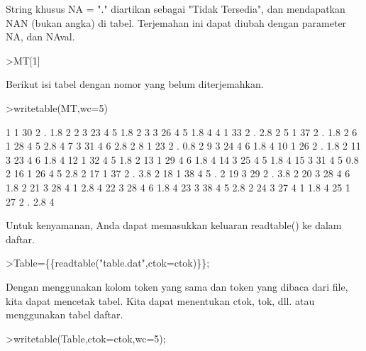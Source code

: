 \documentclass{article}
\begin{document}
\begin{eulernotebook}
\begin{eulercomment}
\begin{eulercomment}
\begin{eulercomment}
String khusus NA = "." diartikan sebagai "Tidak Tersedia", dan
mendapatkan NAN (bukan angka) di tabel. Terjemahan ini dapat diubah
dengan parameter NA, dan NAval.
\end{eulercomment}
\begin{eulerprompt}
>MT[1]
\end{eulerprompt}
\begin{euleroutput}
  [1,  1,  30,  2,  NAN,  1.8,  2]
\end{euleroutput}
\begin{eulercomment}
Berikut isi tabel dengan nomor yang belum diterjemahkan.
\end{eulercomment}
\begin{eulerprompt}
>writetable(MT,wc=5)
\end{eulerprompt}
\begin{euleroutput}
      1    1   30    2    .  1.8    2
      2    3   23    4    5  1.8    2
      3    3   26    4    5  1.8    4
      4    1   33    2    .  2.8    2
      5    1   37    2    .  1.8    2
      6    1   28    4    5  2.8    4
      7    3   31    4    6  2.8    2
      8    1   23    2    .  0.8    2
      9    3   24    4    6  1.8    4
     10    1   26    2    .  1.8    2
     11    3   23    4    6  1.8    4
     12    1   32    4    5  1.8    2
     13    1   29    4    6  1.8    4
     14    3   25    4    5  1.8    4
     15    3   31    4    5  0.8    2
     16    1   26    4    5  2.8    2
     17    1   37    2    .  3.8    2
     18    1   38    4    5    .    2
     19    3   29    2    .  3.8    2
     20    3   28    4    6  1.8    2
     21    3   28    4    1  2.8    4
     22    3   28    4    6  1.8    4
     23    3   38    4    5  2.8    2
     24    3   27    4    1  1.8    4
     25    1   27    2    .  2.8    4
\end{euleroutput}
\begin{eulercomment}
Untuk kenyamanan, Anda dapat memasukkan keluaran readtable() ke dalam
daftar.
\end{eulercomment}
\begin{eulerprompt}
>Table=\{\{readtable("table.dat",ctok=ctok)\}\};
\end{eulerprompt}
\begin{eulercomment}
Dengan menggunakan kolom token yang sama dan token yang dibaca dari
file, kita dapat mencetak tabel. Kita dapat menentukan ctok, tok, dll.
atau menggunakan tabel daftar.
\end{eulercomment}
\begin{eulerprompt}
>writetable(Table,ctok=ctok,wc=5);

\end{eulerprompt}
\end{eulercomment}
\end{eulercomment}
\end{eulernotebook}
\end{document}
